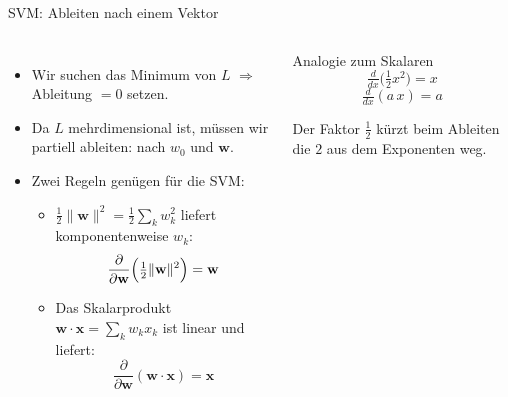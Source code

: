 \begin{frame}{SVM: Ableiten nach einem Vektor}
\footnotesize
\begin{columns}
\begin{itemize}
\item Wir suchen das Minimum von $L$ $\Rightarrow$ Ableitung $=0$ setzen.
\item Da $L$ mehrdimensional ist, müssen wir partiell ableiten: nach $w_0$ und $\mathbf{w}$.\\
\item Zwei Regeln genügen für die SVM:
\begin{itemize}
  \footnotesize
  \item $\frac{1}{2}\lVert\mathbf{w}\rVert^2 = \frac{1}{2}\sum_k w_k^2$
        liefert komponentenweise $w_k$:
        \[
          \frac{\partial}{\partial \mathbf{w}}\Bigl(\tfrac{1}{2}\lVert\mathbf{w}\rVert^2\Bigr)
          = \mathbf{w}
        \]
  \item Das Skalarprodukt $\mathbf{w}\cdot\mathbf{x} = \sum_k w_k x_k$ ist
        linear und liefert:
        \[
          \frac{\partial}{\partial \mathbf{w}}(\mathbf{w}\cdot\mathbf{x})
          = \mathbf{x}
        \]
\end{itemize}
\end{itemize}


\begin{block}{\footnotesize Analogie zum Skalaren}
\[
  \tfrac{d}{dx}\bigl(\tfrac{1}{2}x^2\bigr) = x
\]
\[
  \tfrac{d}{dx}(a\,x) = a
\]

\vspace{0.3em}
Der Faktor $\tfrac{1}{2}$ kürzt beim Ableiten die $2$ aus dem Exponenten
weg.
\end{block}
\end{columns}


\end{frame}


